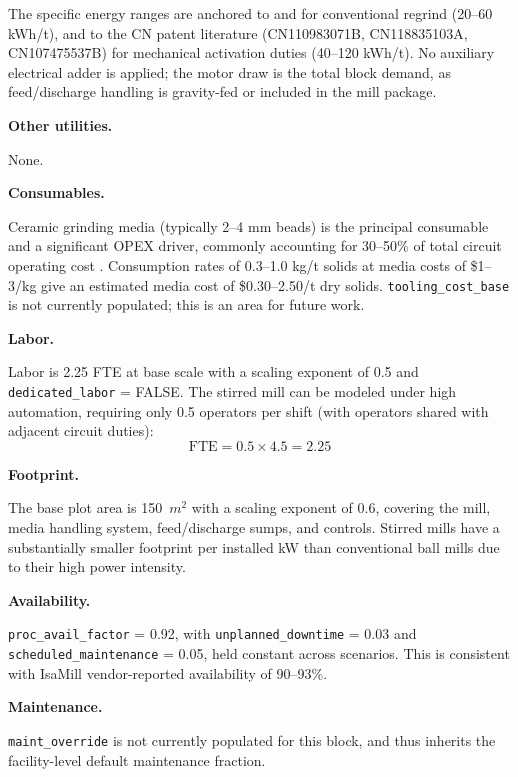 \noindent The specific energy ranges are anchored to \citet{debakkerEnergyUseFine2014} and \citet{brissette2010EnergySavings} for conventional regrind (20--60 kWh/t), and to the CN patent literature (CN110983071B, CN118835103A, CN107475537B) for mechanical activation duties (40--120 kWh/t). No auxiliary electrical adder is applied; the motor draw is the total block demand, as feed/discharge handling is gravity-fed or included in the mill package.

\medskip
\noindent\textbf{Other utilities.}\quad

None.

\medskip
\noindent\textbf{Consumables.}\quad

Ceramic grinding media (typically 2--4 mm beads) is the principal consumable and a significant OPEX driver, commonly accounting for 30--50\% of total circuit operating cost \citep{debakkerEnergyUseFine2014}. Consumption rates of 0.3--1.0 kg/t solids at media costs of \$1--3/kg give an estimated media cost of \$0.30--2.50/t dry solids. \texttt{tooling\_cost\_base} is not currently populated; this is an area for future work.

\medskip
\noindent\textbf{Labor.}\quad

Labor is 2.25 FTE at base scale with a scaling exponent of 0.5 and \texttt{dedicated\_labor} = FALSE. The stirred mill can be modeled under high automation, requiring only 0.5 operators per shift (with operators shared with adjacent circuit duties):
\[
	\text{FTE} = 0.5 \times 4.5 = 2.25
\]

\medskip
\noindent\textbf{Footprint.}\quad

The base plot area is 150~$\si{m^2}$ with a scaling exponent of 0.6, covering the mill, media handling system, feed/discharge sumps, and controls. Stirred mills have a substantially smaller footprint per installed kW than conventional ball mills due to their high power intensity.

\medskip
\noindent\textbf{Availability.}\quad

\texttt{proc\_avail\_factor} = 0.92, with \texttt{unplanned\_downtime} = 0.03 and \texttt{scheduled\_maintenance} = 0.05, held constant across scenarios. This is consistent with IsaMill vendor-reported availability of 90--93\%.

\medskip
\noindent\textbf{Maintenance.}\quad

\texttt{maint\_override} is not currently populated for this block, and thus inherits the facility-level default maintenance fraction.



